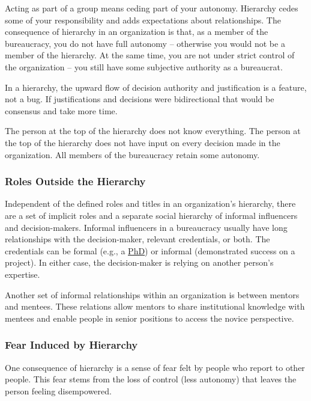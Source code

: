 Acting as part of a group means ceding part of your autonomy. Hierarchy cedes some of your responsibility and adds expectations about relationships.
The consequence of hierarchy in an organization is that, as a member of the bureaucracy, you do not have full autonomy -- otherwise you would not be a member of the hierarchy. At the same time, you are not under strict control of the organization -- you still have some subjective %
authority as a bureaucrat.

In a hierarchy, the upward flow of decision authority and justification is a feature, not a bug.
If justifications and decisions were bidirectional that would be consensus and take more time.

The person at the top of the hierarchy does not know everything. The person at the top of the hierarchy does not have input on every decision made in the organization. All members of the bureaucracy retain some autonomy.

\subsubsection*{Roles Outside the Hierarchy}

Independent of the defined roles and titles in an organization's hierarchy, there are a set of implicit roles and a separate social hierarchy of informal influencers and decision-makers. Informal influencers in a bureaucracy usually have long relationships with the decision-maker, relevant credentials, or both. The credentials can be formal (e.g., a \href{https://en.wikipedia.org/wiki/Doctor_of_Philosophy}{PhD}) 
\iftoggle{WPinmargin}{\marginpar{$>$Wikipedia: Doctor of Philosophy}}{}
or informal (demonstrated success on a project). In either case, the decision-maker is relying on another person's expertise. 

Another set of informal relationships within an organization is between mentors and mentees. These relations allow mentors to share institutional knowledge with mentees and enable people in senior positions to access the novice perspective. 


\subsubsection*{Fear Induced by Hierarchy}

One consequence of hierarchy is a sense of fear felt by people who report to other people. This fear stems from the loss of control (less autonomy) that leaves the person feeling disempowered. 

